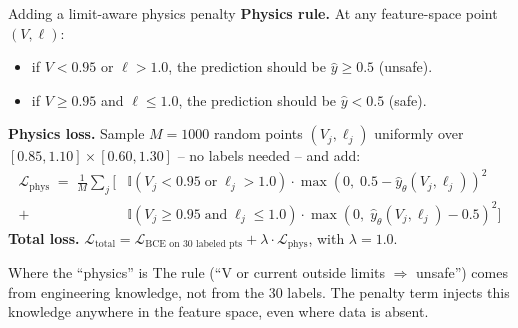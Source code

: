 \documentclass[aspectratio=169,10pt]{beamer}
\begin{document}
\begin{frame}{Adding a limit-aware physics penalty}
\textbf{Physics rule.} At any feature-space point $(V, \ell)$:
\begin{itemize}
  \item if $V < 0.95$ or $\ell > 1.0$, the prediction should be $\hat{y} \geq 0.5$ (unsafe).
  \item if $V \geq 0.95$ and $\ell \leq 1.0$, the prediction should be $\hat{y} < 0.5$ (safe).
\end{itemize}
\textbf{Physics loss.} Sample $M = 1000$ random points $(V_j, \ell_j)$ uniformly over $[0.85, 1.10] \times [0.60, 1.30]$ -- no labels needed -- and add:
\begin{align*}
\mathcal{L}_{\text{phys}} \;=\; \tfrac{1}{M} \sum_j \biggl[
& \mathbb{I}(V_j < 0.95 \;\text{or}\; \ell_j > 1.0) \cdot \max(0,\; 0.5 - \hat{y}_\theta(V_j, \ell_j))^2 \\
+\; & \mathbb{I}(V_j \geq 0.95 \;\text{and}\; \ell_j \leq 1.0) \cdot \max(0,\; \hat{y}_\theta(V_j, \ell_j) - 0.5)^2
\biggr]
\end{align*}
\vspace{0.2em}
\textbf{Total loss.} $\mathcal{L}_{\text{total}} = \mathcal{L}_{\text{BCE on 30 labeled pts}} + \lambda \cdot \mathcal{L}_{\text{phys}}$, with $\lambda = 1.0$.
\vspace{0.4em}
\begin{alertblock}{Where the ``physics'' is}
The rule (``V or current outside limits $\Rightarrow$ unsafe'') comes from engineering knowledge, not from the 30 labels. The penalty term injects this knowledge anywhere in the feature space, even where data is absent.
\end{alertblock}
\end{frame}
\end{document}

